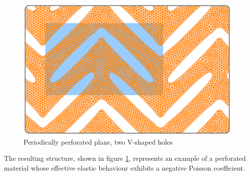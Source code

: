 \begin{figure}[ht] \centering
  \includegraphics[width=140mm]{boomerang-3.eps}
  \caption{Periodically perforated plane, two V-shaped holes}
  \label{\numb section 7.\numb fig 21}
\end{figure}

The resulting structure, shown in figure \ref{\numb section 7.\numb fig 21},
represents an example of a perforated material whose effective elastic behaviour
exhibits a negative Poisson coefficient.
